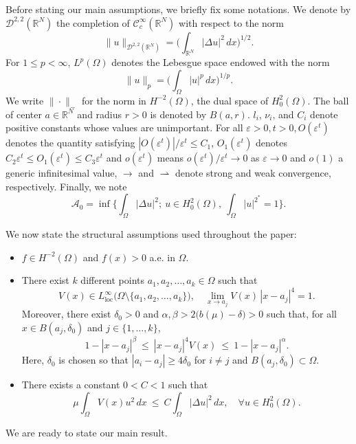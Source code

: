 \documentclass[10pt,a4paper]{amsart}
\numberwithin{equation}{section}
\begin{document}
Before stating our main assumptions, we briefly fix some notations.
We denote by \(\mathcal{D}^{2,2}(\mathbb{R}^N)\) the completion of
\(\mathcal{C}_c^{\infty}(\mathbb{R}^N)\) with respect to the norm
\[
 \|u\|_{\mathcal{D}^{2,2}(\mathbb{R}^N)}
 =\Big( \int_{\mathbb{R}^N} |\Delta u|^2 \, dx \Big)^{1/2}.
\]
For \(1 \leq p < \infty\), \(L^p(\Omega)\) denotes the Lebesgue space endowed with
the norm
\[
 \|u\|_{p}=\Big( \int_{\Omega} |u|^p \, dx \Big)^{1/p}.
\]
We write \(\|\cdot\|_{-}\) for the norm in \(H^{-2}(\Omega)\), the dual space of
\(H^2_0(\Omega)\).
The ball of center \(a \in \mathbb{R}^N\) and radius \(r>0\) is denoted by
 \(B(a,r)\). \(l_i\), \(\nu_i\), and \(C_i\) denote positive constants whose values
 are unimportant. For all \(\varepsilon>0, t>0, O(\varepsilon^t)\) denotes the
quantity satisfying \(|O(\varepsilon^t)|/\varepsilon^t\leq C_1\),
\( O_1(\varepsilon^t)\) denotes \(C_2\varepsilon^t \leqslant O_1(\varepsilon^t)
\leqslant C_3\varepsilon^t\) and \(o(\varepsilon^t)\) means
\(o(\varepsilon^t)/\varepsilon^t\to 0\) as
 \(\varepsilon \to 0\) and \(o(1)\) a generic infinitesimal value,
\(\to\) and \(\rightharpoonup\) denote strong and weak convergence,
respectively. Finally, we note
\[ \label{(A0)}
 \mathcal{A}_{0}=\inf\Big\{ \int_{\Omega }\vert \Delta
u\vert ^{2}; \ u\in H^2_0(\Omega), \ \int _{\Omega}|u|^{2^*}=1 \Big\}.
\]

 We now state the structural assumptions used throughout the paper:
\begin{itemize}
\item[(A1)] \( f \in H^{-2}(\Omega) \) and \( f(x) > 0 \) a.e. in \( \Omega \).

\item[(A2)] There exist $k$ different points \( a_1,a_2,\dots,a_k \in \Omega \) such that
\[
 V(x) \in L^{\infty}_{\mathrm{loc}}\big(\Omega \setminus \{a_1,a_2,\dots,a_k\}\big),
 \quad \lim_{x \to a_j} V(x)\,|x-a_j|^4 = 1.
\]
Moreover, there exist \( \delta_0 > 0 \) and \( \alpha, \beta > 2\big(b(\mu)
- \delta\big) > 0 \) such that, for all \( x \in B(a_j, \delta_0) \) and
\( j \in \{1,\dots,k\} \),
\begin{equation}\label{v}
 1 - |x-a_j|^{\beta} \ \leq\ |x-a_j|^4 V(x) \ \leq\ 1 - |x-a_j|^{\alpha}.
\end{equation}
Here, \( \delta_0 \) is chosen so that \( |a_i-a_j| \geq 4\delta_0 \) for
\( i \neq j \) and \( B(a_j, \delta_0) \subset \Omega \).

\item[(A3)] There exists a constant \( 0 < C < 1 \) such that
\[
 \mu \int_{\Omega} V(x) u^2\,dx \ \leq\ C \int_{\Omega} |\Delta u|^2\,dx,
 \quad \forall u \in H^2_0(\Omega).
\]
\end{itemize}
We are ready to state our main result.
\end{document}
